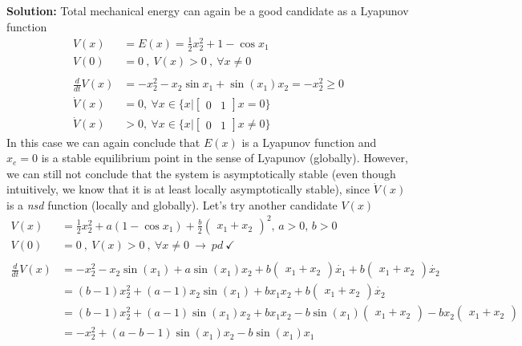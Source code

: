 \documentclass[twoside]{article}
\begin{document}
\textbf{Solution:} Total mechanical energy can again be a good candidate as
a Lyapunov function 
%
\begin{align*}
V(x) &= E(x) = \frac{1}{2} x_2^2 + 1 - \cos{x_1}  \\ 
V(0) &= 0 \ , \ V(x) > 0 \ , \ \forall x \neq 0
\\
\\
\frac{d}{dt} V(x) &= - x_2^2 - x_2 \sin x_1 + \sin(x_1) x_2 = - x_2^2 \geq 0
\\
\dot{V}(x) &= 0 ,\ \forall x \in \lbrace x | \begin{bmatrix}0 & 1\end{bmatrix} x = 0 \rbrace
\\
\dot{V}(x) &> 0 ,\ \forall x \in \lbrace x | \begin{bmatrix}0 & 1\end{bmatrix} x \neq 0 \rbrace
\end{align*}
%
In this case we can again conclude that $E(x)$ is a Lyapunov function and $x_e = 0$
is a stable equilibrium point in the sense of Lyapunov (globally). However, we can still not 
conclude that the system is asymptotically stable (even though intuitively, we know that it is 
at least locally asymptotically stable), since $\dot{V}(x)$ is a \textit{nsd} function 
(locally and globally). Let's try another candidate $V(x)$
%
\begin{align*}
V(x) &= \frac{1}{2} x_2^2 + a ( 1 - \cos{x_1} ) + \frac{b}{2} \begin{pmatrix} x_1 + x_2 \end{pmatrix}^2  ,
\, a > 0 , \,  b > 0
\\ 
V(0) &= 0 \ , \ V(x) > 0 \ , \ \forall x \neq 0 \ \rightarrow \ pd \ \checkmark
\\
\\
\frac{d}{dt} V(x) &= - x_2^2 - x_2 \sin(x_1) + a \sin(x_1) x_2 + b \begin{pmatrix} x_1 + x_2 \end{pmatrix} \dot{x_1} 
+ b \begin{pmatrix} x_1 + x_2 \end{pmatrix} \dot{x_2}
\\
&= (b - 1) x_2^2 + (a - 1) x_2 \sin(x_1) + b x_1 x_2 
+ b \begin{pmatrix} x_1 + x_2 \end{pmatrix} \dot{x_2}
\\
&= (b - 1) x_2^2 + (a - 1) \sin(x_1) x_2 + b x_1 x_2 
- b \sin(x_1) \begin{pmatrix} x_1 + x_2 \end{pmatrix} 
- b x_2\begin{pmatrix} x_1 + x_2 \end{pmatrix} 
\\
&= - x_2^2 + (a - b - 1) \sin(x_1) x_2 - b \sin(x_1) x_1 
\end{align*}
\end{document}
